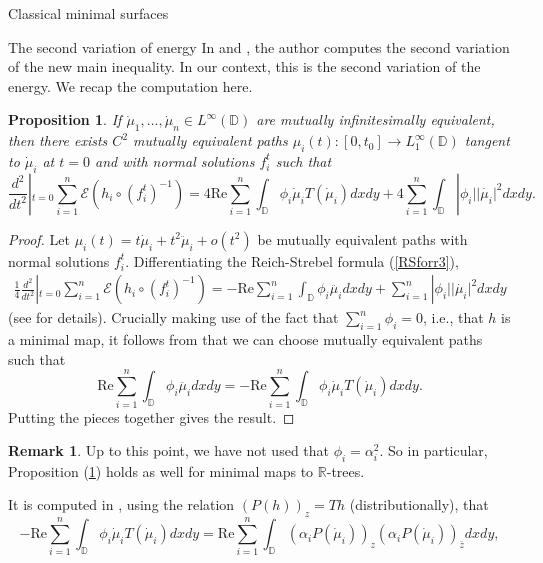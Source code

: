 \documentclass[10pt]{amsart}
\newcommand{\R}{\mathbb R}
\newtheorem{prop}[thm]{Proposition}
\theoremstyle{definition}
\newtheorem{remark}[thm]{Remark}
\begin{document}
\begin{section}{Classical minimal surfaces}
\begin{subsection}{The second variation of energy} 
 In \cite[Lemma 3.2]{M2} and \cite[Proposition 4.2]{M2}, the author computes the second variation of the new main inequality. In our context, this is the second variation of the energy. We recap the computation here. 
 \begin{prop}\label{2varT} If $\dot{\mu}_1,\dots, \dot{\mu}_n\in L^\infty(\mathbb{D})$ are mutually infinitesimally equivalent, then there exists $C^2$ mutually equivalent paths $\mu_i(t): [0,t_0]\to L_1^\infty(\mathbb{D})$ tangent to $\dot{\mu}_i$ at $t=0$ and with normal solutions $f_i^t$ such that
 \begin{equation}\label{2var}
 \frac{d^2}{dt^2}|_{t=0}\sum_{i=1}^n \mathcal{E}(h_i\circ (f_i^t)^{-1})=4\textrm{Re}\sum_{i=1}^n\int_{\mathbb{D}}\phi_i\dot{\mu}_iT(\dot{\mu}_i)dxdy+4\sum_{i=1}^n\int_{\mathbb{D}}|\phi_i||\dot{\mu_i}|^2dxdy.
 \end{equation}
 \end{prop}
 \begin{proof}
 Let $\mu_i(t) = t\dot{\mu}_i + t^2\ddot{\mu}_i +o(t^2)$ be mutually equivalent paths with normal solutions $f_i^t$. Differentiating the Reich-Strebel formula (\ref{RSforr3}),
\begin{align*}
    \frac{1}{4}\frac{d^2}{dt^2}|_{t=0}\sum_{i=1}^n \mathcal{E}(h_i\circ (f_i^t)^{-1}) = -\textrm{Re}\sum_{i=1}^n\int_{\mathbb{D}}\phi_i\ddot{\mu_i}dxdy+\sum_{i=1}^n|\phi_i||\dot{\mu_i}|^2dxdy
\end{align*}
(see \cite[Lemma 3.2]{M2} for details). Crucially making use of the fact that $\sum_{i=1}^n\phi_i=0$, i.e., that $h$ is a minimal map, it follows from \cite[Proposition 4.2]{M2} that we can choose mutually equivalent paths such that $$\textrm{Re}\sum_{i=1}^n\int_{\mathbb{D}}\phi_i\ddot{\mu_i}dxdy=-\textrm{Re}\sum_{i=1}^n\int_{\mathbb{D}}\phi_i\dot{\mu}_iT(\dot{\mu}_i)dxdy.$$
Putting the pieces together gives the result.
 \end{proof}
\begin{remark}
Up to this point, we have not used that $\phi_i=\alpha_i^2$. So in particular, Proposition (\ref{2varT}) holds as well for minimal maps to $\R$-trees. 
\end{remark}
It is computed in \cite[Section 6]{M2}, using the relation $(P(h))_z=Th$ (distributionally), that 
\begin{equation}\label{P1}
    -\textrm{Re}\sum_{i=1}^n\int_{\mathbb{D}}\phi_i\dot{\mu}_iT(\dot{\mu}_i)dxdy=\textrm{Re}\sum_{i=1}^n\int_{\mathbb{D}}(\alpha_i P(\dot{\mu}_i))_{z}(\alpha_i P(\dot{\mu}_i))_{\overline{z}}dxdy,

\end{equation}
\end{subsection}
\end{section}
\end{document}

